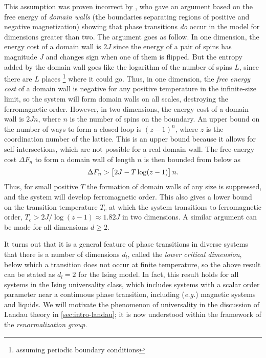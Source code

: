 This assumption was proven incorrect by \textcite{peierls1936ising}, who gave
an argument based on the free energy of \emph{domain walls} (the boundaries
separating regions of positive and negative magnetization) showing that phase
transitions \emph{do} occur in the model for dimensions greater than two. The
argument goes as follow. In one dimension, the energy cost of a domain wall is
$2J$ since the energy of a pair of spins has magnitude $J$ and changes sign
when one of them is flipped. But the entropy added by the domain wall goes like
the logarithm of the number of spins $L$, since there are $L$ places%
\footnote{assuming periodic boundary conditions} where it could go. Thus, in
one dimension, the \emph{free energy cost} of a domain wall is negative for any
positive temperature in the infinite-size limit, so the system will form domain
walls on all scales, destroying the ferromagnetic order. However, in two
dimensions, the energy cost of a domain wall is $2 J n$, where $n$ is the
number of spins on the boundary. An upper bound on the number of ways to form a
closed loop is $(z-1)^n$, where $z$ is the coordination number of the lattice.
This is an upper bound because it allows for self-intersections, which are not
possible for a real domain wall. The free-energy cost $\Delta F_n$ to form a
domain wall of length $n$ is then bounded from below as
\begin{equation}
  \Delta F_n > \left[2J - T \log(z-1)\right] n.
\end{equation}
Thus, for small positive $T$ the formation of domain walls of any size is
suppressed, and the system will develop ferromagnetic order. This also gives a
lower bound on the transition temperature $T_c$ at which the system transitions
to ferromagnetic order, $T_c > 2J/\log(z-1) \approx 1.82 J$ in two dimensions.
A similar argument can be made for all dimensions $d \geq 2$.

It turns out that it is a general feature of phase transitions in diverse
systems that there is a number of dimensions $d_l$, called the \emph{lower
  critical dimension}, below which a transition does not occur at finite
temperature, so the above result can be stated as $d_l=2$ for the Ising model.
In fact, this result holds for all systems in the Ising universality class,
which includes systems with a scalar order parameter near a continuous phase
transition, including (\textit{e.g.}) magnetic systems and liquids. We will
motivate the phenomenon of universality in the discussion of Landau theory in
\cref{sec:intro-landau}; it is now understood within the framework of the
\emph{renormalization group}.

